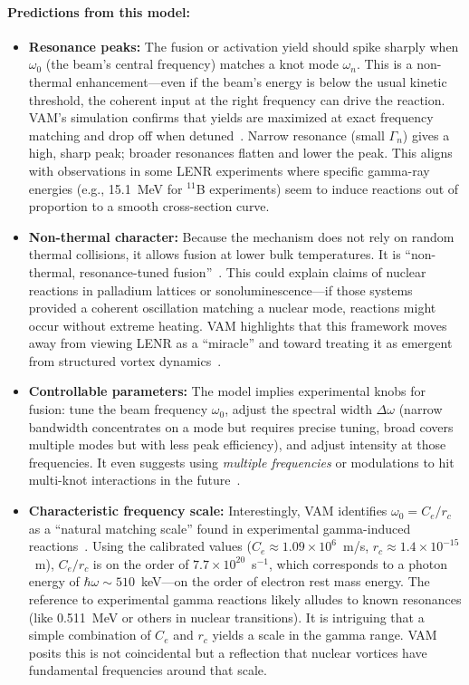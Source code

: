 \documentclass[a4paper,12pt]{article}
\begin{document}
\paragraph{Predictions from this model:}
\begin{itemize}
    \item \textbf{Resonance peaks:} The fusion or activation yield should spike sharply when $\omega_0$ (the beam's central frequency) matches a knot mode $\omega_n$. This is a non-thermal enhancement---even if the beam's energy is below the usual kinetic threshold, the coherent input at the right frequency can drive the reaction. VAM's simulation confirms that yields are maximized at exact frequency matching and drop off when detuned~\cite{vamcore}. Narrow resonance (small $\Gamma_n$) gives a high, sharp peak; broader resonances flatten and lower the peak. This aligns with observations in some LENR experiments where specific gamma-ray energies (e.g., 15.1~MeV for $^{11}$B experiments) seem to induce reactions out of proportion to a smooth cross-section curve.

    \item \textbf{Non-thermal character:} Because the mechanism does not rely on random thermal collisions, it allows fusion at lower bulk temperatures. It is ``non-thermal, resonance-tuned fusion''~\cite{vamcore}. This could explain claims of nuclear reactions in palladium lattices or sonoluminescence---if those systems provided a coherent oscillation matching a nuclear mode, reactions might occur without extreme heating. VAM highlights that this framework moves away from viewing LENR as a ``miracle'' and toward treating it as emergent from structured vortex dynamics~\cite{vamcore}.

    \item \textbf{Controllable parameters:} The model implies experimental knobs for fusion: tune the beam frequency $\omega_0$, adjust the spectral width $\Delta\omega$ (narrow bandwidth concentrates on a mode but requires precise tuning, broad covers multiple modes but with less peak efficiency), and adjust intensity at those frequencies. It even suggests using \textit{multiple frequencies} or modulations to hit multi-knot interactions in the future~\cite{vamcore}.

    \item \textbf{Characteristic frequency scale:} Interestingly, VAM identifies $\omega_0 = C_e/r_c$ as a ``natural matching scale'' found in experimental gamma-induced reactions~\cite{vamcore}. Using the calibrated values ($C_e\approx1.09\times10^6$~m/s, $r_c\approx1.4\times10^{-15}$~m), $C_e/r_c$ is on the order of $7.7\times10^{20}$~s$^{-1}$, which corresponds to a photon energy of $\hbar \omega \sim 510$~keV---on the order of electron rest mass energy. The reference to experimental gamma reactions likely alludes to known resonances (like 0.511~MeV or others in nuclear transitions). It is intriguing that a simple combination of $C_e$ and $r_c$ yields a scale in the gamma range. VAM posits this is not coincidental but a reflection that nuclear vortices have fundamental frequencies around that scale.


\end{itemize}
\end{document}
